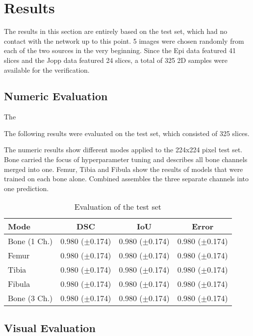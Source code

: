 \section{Results}

The results in this section are entirely based on the test set, which had no contact with the network up to this point. 5 images were chosen randomly from each of the two sources in the very beginning. Since the Epi data featured 41 slices and the Jopp data featured 24 slices, a total of 325 2D samples were available for the verification.

\subsection{Numeric Evaluation}

The

The following results were evaluated on the test set, which consisted of 325 slices. 

The numeric results show different modes applied to the 224x224 pixel test set. Bone carried the focus of hyperparameter tuning and describes all bone channels merged into one. Femur, Tibia and Fibula show the results of models that were trained on each bone alone. Combined assembles the three separate channels into one prediction.

\begin{table}[H]
    \centering
    \begin{tabular}{| l | c | c | c |}
    \hline
    Mode       & DSC                & IoU                & Error             \\ 
    \hline
    \hline
    Bone (1 Ch.) & 0.980 ($\pm$0.174) & 0.980 ($\pm$0.174) & 0.980 ($\pm$0.174)\\
    \hline
    Femur        & 0.980 ($\pm$0.174) & 0.980 ($\pm$0.174) & 0.980 ($\pm$0.174)\\
    \hline
    Tibia        & 0.980 ($\pm$0.174) & 0.980 ($\pm$0.174) & 0.980 ($\pm$0.174)\\
    \hline
    Fibula       & 0.980 ($\pm$0.174) & 0.980 ($\pm$0.174) & 0.980 ($\pm$0.174)\\
    \hline
    Bone (3 Ch.) & 0.980 ($\pm$0.174) & 0.980 ($\pm$0.174) & 0.980 ($\pm$0.174)\\
    \hline
    \end{tabular}
    \caption{Evaluation of the test set}
\end{table}

\subsection{Visual Evaluation}

\newpage